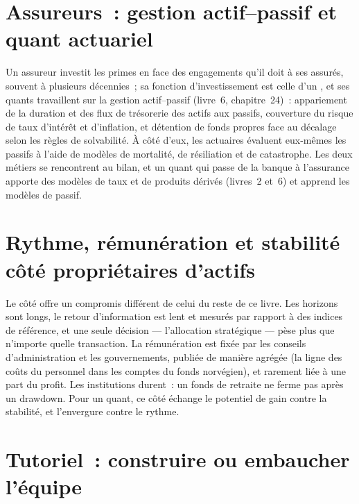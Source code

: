 \section{Assureurs~: gestion actif--passif et quant actuariel}

Un assureur investit les primes en face des engagements qu'il doit à ses assurés, souvent à plusieurs décennies~; sa fonction d'investissement est
celle d'un , et ses quants travaillent sur la gestion actif--passif (livre~6, chapitre~24)~: appariement de la duration et
des flux de trésorerie des actifs aux passifs, couverture du risque de taux d'intérêt et d'inflation, et détention de fonds propres face au décalage
selon les règles de solvabilité. À côté d'eux, les actuaires évaluent eux-mêmes les passifs à l'aide de modèles de mortalité, de résiliation et
de catastrophe. Les deux métiers se rencontrent au bilan, et un quant qui passe de la banque à l'assurance
apporte des modèles de taux et de produits dérivés (livres~2 et~6) et apprend les modèles de passif.

\section{Rythme, rémunération et stabilité côté propriétaires d'actifs}

Le côté  offre un compromis différent de celui du reste de ce livre. Les horizons sont longs, le retour d'information est lent et
mesurés par rapport à des indices de référence, et une seule décision --- l'allocation stratégique --- pèse plus que n'importe quelle transaction. La rémunération est fixée par
les conseils d'administration et les gouvernements, publiée de manière agrégée (la ligne des coûts du personnel dans les comptes du fonds norvégien), et rarement liée
à une part du profit. Les institutions durent~: un fonds de retraite ne ferme pas après un drawdown. Pour un quant, ce côté échange
le potentiel de gain contre la stabilité, et l'envergure contre le rythme.

\section{Tutoriel~: construire ou embaucher l'équipe}\label{tut:in:asset-managers-pensions-sovereign-funds-and-insurers:tut}


